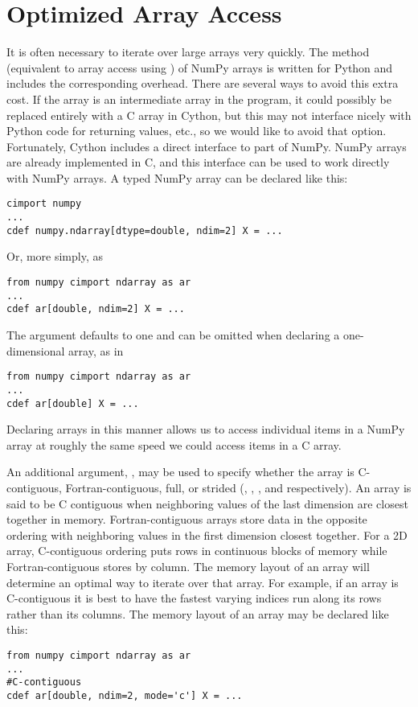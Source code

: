 \section*{Optimized Array Access}
It is often necessary to iterate over large arrays very quickly.
The  method (equivalent to array access using \li{[ ]}) of NumPy arrays is written for Python and includes the corresponding overhead.
There are several ways to avoid this extra cost.
If the array is an intermediate array in the program, it could possibly be replaced entirely with a C array in Cython, but this may not interface nicely with Python code for returning values, etc., so we would like to avoid that option.
Fortunately, Cython includes a direct interface to part of NumPy.
NumPy arrays are already implemented in C, and this interface can be used to work directly with NumPy arrays.
A typed NumPy array can be declared like this:
\begin{lstlisting}
cimport numpy
...
cdef numpy.ndarray[dtype=double, ndim=2] X = ...
\end{lstlisting}
Or, more simply, as
\begin{lstlisting}
from numpy cimport ndarray as ar
...
cdef ar[double, ndim=2] X = ...
\end{lstlisting}
The  argument defaults to one and can be omitted when declaring a one-dimensional array, as in
\begin{lstlisting}
from numpy cimport ndarray as ar
...
cdef ar[double] X = ...
\end{lstlisting}
Declaring arrays in this manner allows us to access individual items in a NumPy array at roughly the same speed we could access items in a C array.

An additional argument, , may be used to specify whether the array is C-contiguous, Fortran-contiguous, full, or strided (, , , and  respectively).
An array is said to be C contiguous when neighboring values of the last dimension are closest together in memory.
Fortran-contiguous arrays store data in the opposite ordering with neighboring values in the first dimension closest together.
For a 2D array, C-contiguous ordering puts rows in continuous blocks of memory while Fortran-contiguous stores by column.
The memory layout of an array will determine an optimal way to iterate over that array. 
For example, if an array is C-contiguous it is best to have the fastest varying indices run along its rows rather than its columns.
The memory layout of an array may be declared like this:
\begin{lstlisting}
from numpy cimport ndarray as ar
...
#C-contiguous
cdef ar[double, ndim=2, mode='c'] X = ...
\end{lstlisting}

